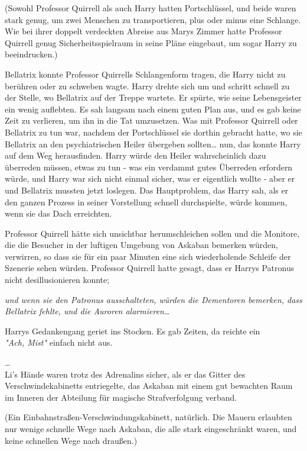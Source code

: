{(Sowohl Professor Quirrell als auch Harry hatten Portschlüssel, und beide waren stark genug, um zwei Menschen zu transportieren, plus oder minus eine Schlange.\\ Wie bei ihrer doppelt verdeckten Abreise aus Marys Zimmer hatte Professor Quirrell genug Sicherheitsspielraum in seine Pläne eingebaut, um sogar Harry zu beeindrucken.)

Bellatrix konnte Professor Quirrells Schlangenform tragen, die Harry nicht zu berühren oder zu schweben wagte. Harry drehte sich um und schritt schnell zu der Stelle, wo Bellatrix auf der Treppe wartete. Er spürte, wie seine Lebensgeister ein wenig auflebten. Es sah langsam nach einem guten Plan aus, und es gab keine Zeit zu verlieren, um ihn in die Tat umzusetzen. Was mit Professor Quirrell oder Bellatrix zu tun war, nachdem der Portschlüssel sie dorthin gebracht hatte, wo sie Bellatrix an den psychiatrischen Heiler übergeben sollten… nun, das konnte Harry auf dem Weg herausfinden. Harry würde den Heiler wahrscheinlich dazu überreden müssen, etwas zu tun - was ein verdammt gutes Überreden erfordern würde, und Harry war sich nicht einmal sicher, was er eigentlich wollte - aber er und Bellatrix mussten jetzt loslegen. Das Hauptproblem, das Harry sah, als er den ganzen Prozess in seiner Vorstellung schnell durchspielte, würde kommen, wenn sie das Dach erreichten.

Professor Quirrell hätte sich unsichtbar herumschleichen sollen und die Monitore, die die Besucher in der luftigen Umgebung von Askaban bemerken würden, verwirren, so dass sie für ein paar Minuten eine sich wiederholende Schleife der Szenerie sehen würden. Professor Quirrell hatte gesagt, dass er Harrys Patronus nicht desillusionieren konnte;

\emph{und wenn sie den Patronus ausschalteten, würden die Dementoren bemerken, dass Bellatrix fehlte, und die Auroren alarmieren…}

Harrys Gedankengang geriet ins Stocken. Es gab Zeiten, da reichte ein\\ \emph{"Ach, Mist"} einfach nicht aus.

…\\ Li's Hände waren trotz des Adrenalins sicher, als er das Gitter des Verschwindekabinetts entriegelte, das Askaban mit einem gut bewachten Raum im Inneren der Abteilung für magische Strafverfolgung verband.

(Ein Einbahnstraßen-Verschwindungskabinett, natürlich. Die Mauern erlaubten nur wenige schnelle Wege nach Askaban, die alle stark eingeschränkt waren, und keine schnellen Wege nach draußen.)

}
